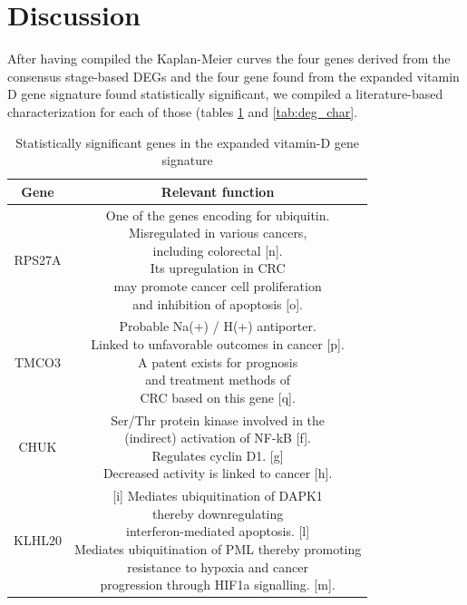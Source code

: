 \documentclass[fleqn,10pt]{SelfArx} %
\begin{document}
\section{Discussion}
After having compiled the Kaplan-Meier curves the four genes derived from the consensus stage-based DEGs and the four gene found from the expanded vitamin D gene signature found statistically significant, we compiled a literature-based characterization for each of those (tables \ref{tab:vit_char} and \ref{tab:deg_char}.
\begin{table}[ht]
	\centering
	\small
	\begin{tabular}{cc}
		\hline
		Gene & Relevant function\\
		\hline
		RPS27A & \makecell{One of the genes encoding for ubiquitin.\\Misregulated in various cancers,\\including colorectal [n].\\Its upregulation in CRC\\may promote cancer cell proliferation\\and inhibition of apoptosis [o].}\\
		TMCO3 & \makecell{Probable Na(+) / H(+) antiporter.\\Linked to unfavorable outcomes in cancer [p].\\A patent exists for prognosis\\and treatment methods of\\CRC based on this gene [q].}\\
		CHUK & \makecell{Ser/Thr protein kinase involved in the\\(indirect) activation of NF-kB [f].\\Regulates cyclin D1. [g]\\Decreased activity is linked to cancer [h].}\\
		KLHL20 & \makecell{[i] Mediates ubiquitination of DAPK1\\thereby downregulating\\interferon-mediated apoptosis. [l]\\Mediates ubiquitination of PML thereby promoting\\resistance to hypoxia and cancer\\progression through HIF1a signalling. [m].}\\
		\hline
	\end{tabular}
	\caption{Statistically significant genes in the expanded vitamin-D gene signature}
	\label{tab:vit_char}
\end{table}
\end{document}
